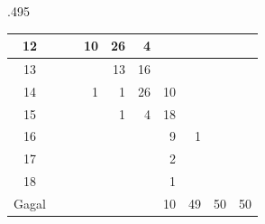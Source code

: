 \begin{table}
\begin{subtable}{.495\linewidth}
{\begin{tabular}{|c|lllllllll|}
			12                                                                             & \multicolumn{1}{r|}{}   & \multicolumn{1}{r|}{}   & \multicolumn{1}{r|}{10} & \multicolumn{1}{r|}{26} & \multicolumn{1}{r|}{4}  & \multicolumn{1}{r|}{}   & \multicolumn{1}{r|}{}   & \multicolumn{1}{r|}{}   &                         \\ \hline
			13                                                                             & \multicolumn{1}{r|}{}   & \multicolumn{1}{r|}{}   & \multicolumn{1}{r|}{}   & \multicolumn{1}{r|}{13} & \multicolumn{1}{r|}{16} & \multicolumn{1}{r|}{}   & \multicolumn{1}{r|}{}   & \multicolumn{1}{r|}{}   &                         \\ \hline
			14                                                                             & \multicolumn{1}{r|}{}   & \multicolumn{1}{r|}{}   & \multicolumn{1}{r|}{1}  & \multicolumn{1}{r|}{1}  & \multicolumn{1}{r|}{26} & \multicolumn{1}{r|}{10} & \multicolumn{1}{r|}{}   & \multicolumn{1}{r|}{}   &                         \\ \hline
			15                                                                             & \multicolumn{1}{r|}{}   & \multicolumn{1}{r|}{}   & \multicolumn{1}{r|}{}   & \multicolumn{1}{r|}{1}  & \multicolumn{1}{r|}{4}  & \multicolumn{1}{r|}{18} & \multicolumn{1}{r|}{}   & \multicolumn{1}{r|}{}   &                         \\ \hline
			16                                                                             & \multicolumn{1}{r|}{}   & \multicolumn{1}{r|}{}   & \multicolumn{1}{r|}{}   & \multicolumn{1}{r|}{}   & \multicolumn{1}{r|}{}   & \multicolumn{1}{r|}{9}  & \multicolumn{1}{r|}{1}  & \multicolumn{1}{r|}{}   &                         \\ \hline
			17                                                                             & \multicolumn{1}{r|}{}   & \multicolumn{1}{r|}{}   & \multicolumn{1}{r|}{}   & \multicolumn{1}{r|}{}   & \multicolumn{1}{r|}{}   & \multicolumn{1}{r|}{2}  & \multicolumn{1}{r|}{}   & \multicolumn{1}{r|}{}   &                         \\ \hline
			18                                                                             & \multicolumn{1}{r|}{}   & \multicolumn{1}{r|}{}   & \multicolumn{1}{r|}{}   & \multicolumn{1}{r|}{}   & \multicolumn{1}{r|}{}   & \multicolumn{1}{r|}{1}  & \multicolumn{1}{r|}{}   & \multicolumn{1}{r|}{}   &                         \\ \hline
			Gagal                                                                          & \multicolumn{1}{r|}{}   & \multicolumn{1}{r|}{}   & \multicolumn{1}{r|}{}   & \multicolumn{1}{r|}{}   & \multicolumn{1}{r|}{}   & \multicolumn{1}{r|}{10} & \multicolumn{1}{r|}{49} & \multicolumn{1}{r|}{50} & 50                      \\ \hline
			\end{tabular}
		}
	\end{subtable}
\end{table}

